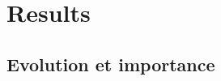 \documentclass[3p,procedia]{elsarticle}
\begin{document}
















\section{Results}




\subsection{Evolution et importance}
\end{document}
